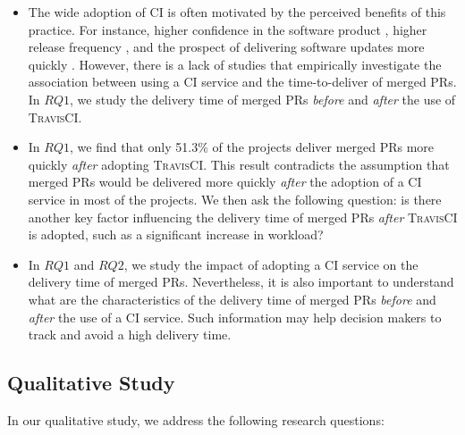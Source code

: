 \begin{itemize}
    \item \textit{\textbf{\RQone}} 
    The wide adoption of CI is often motivated by the perceived benefits of this practice. For instance, higher confidence in the software product \citep{Duvall2007-tb}, higher release frequency \citep{Stahl:2014:MCI:2562355.2562828}, and the prospect of delivering software updates more quickly \citep{Laukkanen2015-ab}. However, there is a lack of studies that empirically investigate the association between using a CI service and the time-to-deliver of merged PRs. In $RQ1$, we study the delivery time of merged PRs \textit{before} and \textit{after} the use of \textsc{TravisCI}.
	
    \item \textit{\textbf{\RQtwo}} 
    In $RQ1$, we find that only 51.3\% of the projects deliver merged PRs more quickly \textit{after} adopting \textsc{TravisCI}. This result contradicts the assumption that merged PRs would be delivered more quickly {\em after} the adoption of a CI service in most of the projects.
    We then ask the following question: is there another key factor influencing the delivery time of merged PRs {\em after} \textsc{TravisCI} is adopted, such as a significant increase in workload?
		
    \item \textit{\textbf{\RQthree}} 	
    In $RQ1$ and $RQ2$, we study the impact of adopting a CI service on the delivery time of merged PRs. Nevertheless, it is also important to understand what are the characteristics of the delivery time of merged PRs \textit{before} and \textit{after} the use of a CI service. Such information may help decision makers to track and avoid a high delivery time.
\end{itemize}

\subsection{\textbf{Qualitative Study}}

In our qualitative study, we address the following research questions:
    	
